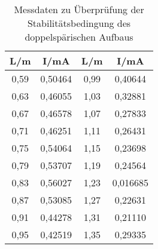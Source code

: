 \begin{table}[h!]
  \centering
  \caption{Messdaten zu Überprüfung der Stabilitätsbedingung des doppelspärischen Aufbaus}
  \label{tab:stabsphere}
  \begin{tabular}{c c c c}
    \toprule
      L/m & I/mA & L/m & I/mA \\
      \midrule
      0,59  & 0,50464 & 0,99  & 0,40644 \\
      0,63  & 0,46055 & 1,03  & 0,32881 \\
      0,67  & 0,46578 & 1,07  & 0,27833 \\
      0,71  & 0,46251 & 1,11  & 0,26431 \\
      0,75  & 0,54064 & 1,15  & 0,23698 \\
      0,79  & 0,53707 & 1,19  & 0,24564 \\
      0,83  & 0,56027 & 1,23  & 0,016685\\
      0,87  & 0,53085 & 1,27  & 0,22631 \\
      0,91  & 0,44278 & 1,31  & 0,21110 \\
      0,95  & 0,42519 & 1,35  & 0,29335 \\
    \bottomrule
  \end{tabular}
\end{table}

%
